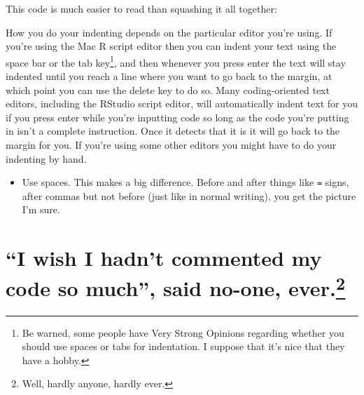 \documentclass[
]{book}
\newenvironment{Shaded}{\begin{snugshade}}{\end{snugshade}}
\newcommand{\DataTypeTok}[1]{\textcolor[rgb]{0.13,0.29,0.53}{#1}}
\newcommand{\DecValTok}[1]{\textcolor[rgb]{0.00,0.00,0.81}{#1}}
\newcommand{\FloatTok}[1]{\textcolor[rgb]{0.00,0.00,0.81}{#1}}
\newcommand{\KeywordTok}[1]{\textcolor[rgb]{0.13,0.29,0.53}{\textbf{#1}}}
\newcommand{\NormalTok}[1]{#1}
\newcommand{\OperatorTok}[1]{\textcolor[rgb]{0.81,0.36,0.00}{\textbf{#1}}}
\newcommand{\StringTok}[1]{\textcolor[rgb]{0.31,0.60,0.02}{#1}}
\providecommand{\tightlist}{%
  \setlength{\itemsep}{0pt}\setlength{\parskip}{0pt}}
\begin{document}
This code is much easier to read than squashing it all together:

\begin{Shaded}
\end{Shaded}

How you do your indenting depends on the particular editor you're using. If you're using the Mac R script editor then you can indent your text using the space bar or the tab key\footnote{Be warned, some people have Very Strong Opinions regarding whether you should use spaces or tabs for indentation. I suppose that it's nice that they have a hobby.}, and then whenever you press enter the text will stay indented until you reach a line where you want to go back to the margin, at which point you can use the delete key to do so. Many coding-oriented text editors, including the RStudio script editor, will automatically indent text for you if you press enter while you're inputting code so long as the code you're putting in isn't a complete instruction. Once it detects that it is it will go back to the margin for you. If you're using some other editors you might have to do your indenting by hand.

\begin{itemize}
\tightlist
\item
  Use spaces. This makes a big difference. Before and after things like \texttt{=} signs, after commas but not before (just like in normal writing), you get the picture I'm sure.
\end{itemize}

\hypertarget{i-wish-i-hadnt-commented-my-code-so-much-said-no-one-ever-4.}{%
\section[``I wish I hadn't commented my code so much'', said no-one, ever.]{\texorpdfstring{``I wish I hadn't commented my code so much'', said no-one, ever.\footnote{Well, hardly anyone, hardly ever.}}{``I wish I hadn't commented my code so much'', said no-one, ever.}}\label{i-wish-i-hadnt-commented-my-code-so-much-said-no-one-ever-4.}}
\end{document}
